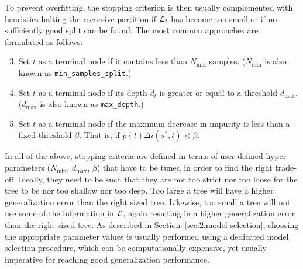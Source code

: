 To prevent overfitting, the stopping criterion is then usually complemented
with heuristics halting the recursive partition if ${\cal L}_t$ has become too
small or if no sufficiently good split can be found. The most common approaches
are formulated as follows:

\begin{enumerate}\setcounter{enumi}{2}

\item Set $t$ as a terminal node if it contains less than $N_\text{min}$ samples.
($N_\text{min}$ is also known as \texttt{min\_samples\_split}.)

\item Set $t$ as a terminal node if its depth $d_t$ is greater or equal to a threshold $d_\text{max}$.
($d_\text{max}$ is also known as \texttt{max\_depth}.)

\item Set $t$ as a terminal node if the maximum decrease in impurity is less than
a fixed threshold $\beta$. That is, if $p(t) \Delta i(s^*, t) < \beta$.

\end{enumerate}

In all of the above, stopping criteria are defined in terms of user-defined
hyper-parameters ($N_\text{min}$, $d_\text{max}$, $\beta$) that have to be
tuned in order to find the right trade-off. Ideally, they need to
be such that they are nor too strict nor too loose for the tree to be nor too
shallow nor too deep. Too large a tree will have a higher generalization error
than the right sized tree. Likewise, too small a tree will not use some of the
information in ${\cal L}$, again resulting in a higher generalization error
than the right sized tree. As described in Section~\ref{sec:2:model-selection},
choosing the appropriate parameter values is usually performed using a dedicated
model selection procedure, which can be computationally expensive, yet usually
imperative for reaching good generalization performance.

